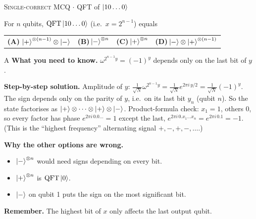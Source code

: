 \documentclass[11pt,a4paper]{article}
\newcommand{\optlabel}[1]{\textbf{(#1)}}
\newcommand{\correctlabel}[1]{\textcolor{okgreen}{\textbf{(#1)}\,\ding{51}}}
\newenvironment{qitem}[1]{\begin{list}{}{\setlength{\leftmargin}{3.3em}\setlength{\labelwidth}{3.1em}%
  \setlength{\labelsep}{0.2em}\setlength{\topsep}{3pt}\setlength{\parsep}{3pt}}\item[\textbf{Q.#1}\hfill]}{\end{list}}
\newcommand{\qsep}{\par\vspace{2pt}{\color{black!15}\hrule}\vspace{4pt}}
\newcommand{\qmeta}[2]{{\footnotesize\color{black!60}\textsc{#1} \;$\cdot$\; #2}\par}
\newcommand{\QFTop}{\mathrm{QFT}}
\begin{document}
\begin{qitem}{50}
\qmeta{Single-correct MCQ}{QFT of $\ket{10\dots0}$}
For $n$ qubits, $\mathrm{QFT}\ket{10\dots0}$ (i.e.\ $x = 2^{n-1}$) equals
\par\smallskip\noindent\begin{tabularx}{\linewidth}{@{}*{4}{L}@{}}
\correctlabel{A}\,$\ket{+}^{\otimes(n-1)}\otimes\ket{-}$ & \optlabel{B}\,$\ket{-}^{\otimes n}$ & \optlabel{C}\,$\ket{+}^{\otimes n}$ & \optlabel{D}\,$\ket{-}\otimes\ket{+}^{\otimes(n-1)}$
\end{tabularx}
\end{qitem}
\begin{solbox}{A}
\textbf{\color{brand}What you need to know.} $\omega^{2^{n-1}y} = (-1)^y$ depends only on the last bit of $y$.

\textbf{\color{brand}Step-by-step solution.} Amplitude of $y$: $\frac{1}{\sqrt N}\omega^{2^{n-1}y} = \frac{1}{\sqrt N}e^{2\pi i\,y/2} = \frac{1}{\sqrt N}(-1)^{y}$. The sign depends only on
the parity of $y$, i.e.\ on its last bit $y_n$ (qubit $n$). So the state factorises as
$\ket{+}\otimes\dots\otimes\ket{+}\otimes\ket{-}$. Product-formula check: $x_1 = 1$, others $0$, so every factor has phase
$e^{2\pi i\,0.0\dots}=1$ except the last, $e^{2\pi i\,0.x_1\dots x_n} = e^{2\pi i\,0.1} = -1$. (This is the ``highest frequency''
alternating signal $+,-,+,-,\dots$.)

\textbf{\color{brand}Why the other options are wrong.}
\begin{itemize}[leftmargin=2.4em, itemsep=1pt, topsep=2pt]
\item[\textbf{(B)}] $\ket-^{\otimes n}$ would need signs depending on every bit.
\item[\textbf{(C)}] $\ket+^{\otimes n}$ is $\QFTop\ket0$.
\item[\textbf{(D)}] $\ket-$ on qubit 1 puts the sign on the most significant bit.
\end{itemize}
\textbf{\color{brand}Remember.} The highest bit of $x$ only affects the last output qubit.
\end{solbox}
\qsep
\end{document}
